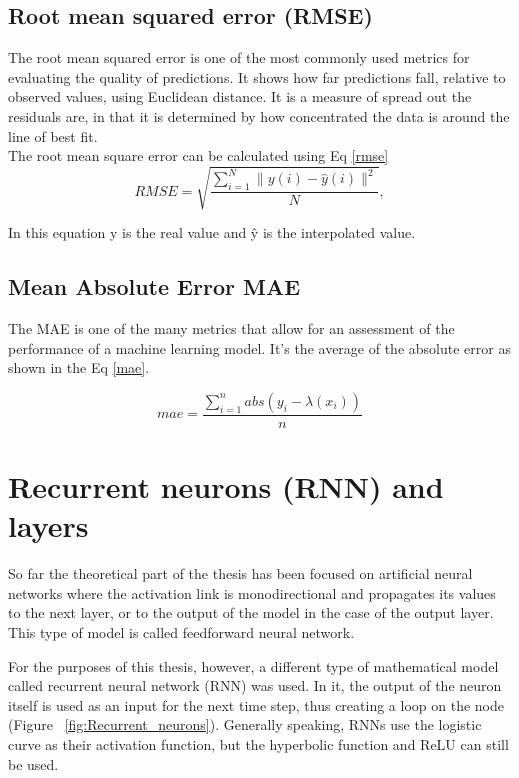 \subsection{Root mean squared error (RMSE)}
The root mean squared error \autocite{RossStat} is one of the most commonly used metrics for evaluating the quality of predictions. It shows how far predictions fall, relative to observed values, using Euclidean distance. It is a measure of spread out the residuals are, in that it is determined by how concentrated the data is around the line of best fit.
\\The root mean square error can be calculated using Eq \eqref{rmse}
\begin{equation}
R M S E=\sqrt{\frac{\sum_{i=1}^{N}\|y(i)-\hat{y}(i)\|^{2}}{N}},
\label{rmse}
\end{equation}

In this equation y is the real value and ŷ  is the interpolated value.

\subsection{Mean Absolute Error MAE}
The MAE is one of the many metrics that allow for an assessment of the performance  of a machine learning model. It’s the average of the absolute error as shown in the Eq \eqref{mae}.

\begin{equation}
m a e=\frac{\sum_{i=1}^{n} a b s\left(y_{i}-\lambda\left(x_{i}\right)\right)}{n}
\label{mae}
\end{equation}

\clearpage

\section{Recurrent neurons (RNN) and layers}
So far the theoretical part of the thesis has been focused on artificial neural networks where the activation link is monodirectional and propagates its values to the next layer, or to the output of the model in the case of the output layer. This type of model is called feedforward neural network.

For the purposes of this thesis, however, a different type of mathematical model called recurrent neural network (RNN) was used. In it, the output of the neuron itself is used as an input for the next time step, thus creating a loop on the node (Figure ~\ref{fig:Recurrent_neurons}).
Generally speaking, RNNs use the logistic curve as their activation function, but the hyperbolic function and ReLU can still be used.

